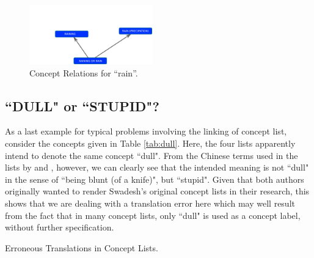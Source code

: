 \documentclass[10pt, a4paper]{article}
\begin{document}
  \begin{figure}[h]
  \includegraphics[width=0.475\textwidth]{img/rain.pdf}
  \caption{Concept Relations for ``rain''.}
  \label{fig:rain}
\end{figure}

\subsection{``DULL" or ``STUPID"?}

As a last example for typical problems involving the linking of concept list, consider the concepts
given in Table \ref{tab:dull}. Here, the four lists apparently intend to denote the same concept
``dull". From the Chinese terms used in the lists by  and ,
however, we can clearly see that the intended meaning is not ``dull" in the sense of ``being blunt
(of a knife)", but ``stupid". Given that both authors originally wanted to render Swadesh's original
concept lists in their research, this shows that we are dealing with a translation error here which
may well result from the fact that in many concept lists, only ``dull" is used as a concept label,
without further specification. 
 
\begin{table}[h]
    \caption{Erroneous Translations in Concept Lists.}
    \label{tab:dull}
  \end{table}
\end{document}
